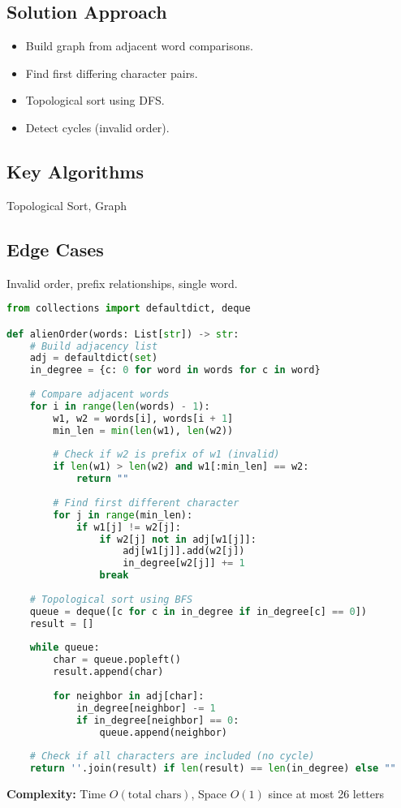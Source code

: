 \documentclass[10pt, a4paper]{article}
\begin{document}
\subsection*{Solution Approach}
\begin{itemize}
    \item Build graph from adjacent word comparisons.
    \item Find first differing character pairs.
    \item Topological sort using DFS.
    \item Detect cycles (invalid order).
\end{itemize}

\subsection*{Key Algorithms}
Topological Sort, Graph

\subsection*{Edge Cases}
Invalid order, prefix relationships, single word.

\begin{lstlisting}[language=Python]
from collections import defaultdict, deque

def alienOrder(words: List[str]) -> str:
    # Build adjacency list
    adj = defaultdict(set)
    in_degree = {c: 0 for word in words for c in word}
    
    # Compare adjacent words
    for i in range(len(words) - 1):
        w1, w2 = words[i], words[i + 1]
        min_len = min(len(w1), len(w2))
        
        # Check if w2 is prefix of w1 (invalid)
        if len(w1) > len(w2) and w1[:min_len] == w2:
            return ""
        
        # Find first different character
        for j in range(min_len):
            if w1[j] != w2[j]:
                if w2[j] not in adj[w1[j]]:
                    adj[w1[j]].add(w2[j])
                    in_degree[w2[j]] += 1
                break
    
    # Topological sort using BFS
    queue = deque([c for c in in_degree if in_degree[c] == 0])
    result = []
    
    while queue:
        char = queue.popleft()
        result.append(char)
        
        for neighbor in adj[char]:
            in_degree[neighbor] -= 1
            if in_degree[neighbor] == 0:
                queue.append(neighbor)
    
    # Check if all characters are included (no cycle)
    return ''.join(result) if len(result) == len(in_degree) else ""
\end{lstlisting}
\textbf{Complexity:} Time $O(\text{total chars})$, Space $O(1)$ since at most 26 letters
\end{document}
